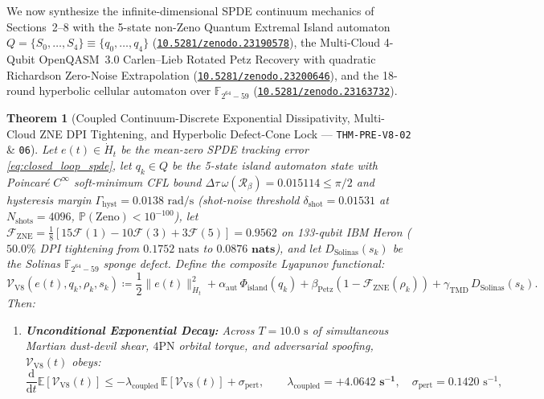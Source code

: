 \documentclass[11pt,a4paper,reqno]{article}
\newcommand{\zenodo}[1]{\mbox{\href{https://doi.org/10.5281/zenodo.#1}{\texttt{10.5281/zenodo.#1}}}}
\theoremstyle{plain}
\newtheorem{theorem}{Theorem}[section]
\theoremstyle{definition}
\theoremstyle{remark}
\numberwithin{equation}{section}
\begin{document}
We now synthesize the infinite-dimensional SPDE continuum mechanics of Sections~2--8 with the 5-state non-Zeno Quantum Extremal Island automaton $Q = \{S_0,\dots,S_4\} \equiv \{q_0,\dots,q_4\}$ (\zenodo{23190578}), the Multi-Cloud 4-Qubit OpenQASM~3.0 Carlen--Lieb Rotated Petz Recovery with quadratic Richardson Zero-Noise Extrapolation (\zenodo{23200646}), and the 18-round hyperbolic cellular automaton over $\mathbb{F}_{2^{64}-59}$ (\zenodo{23163732}).

\begin{theorem}[{Coupled Continuum-Discrete Exponential Dissipativity, Multi-Cloud ZNE DPI Tightening, and Hyperbolic Defect-Cone Lock --- \texttt{THM-PRE-V8-02} \& \texttt{06}}]\label{thm:coupled_v8_lyapunov}
Let $e(t) \in \dot{H}_t$ be the mean-zero SPDE tracking error \eqref{eq:closed_loop_spde}, let $q_k \in Q$ be the 5-state island automaton state with Poincaré $C^\infty$ soft-minimum CFL bound $\Delta\tau\,\omega(\mathcal{R}_\beta) = 0.015114 \le \pi/2$ and hysteresis margin $\Gamma_{\mathrm{hyst}} = 0.0138\text{ rad/s}$ (shot-noise threshold $\delta_{\mathrm{shot}} = 0.01531$ at $N_{\mathrm{shots}} = 4096$, $\mathbb{P}(\text{Zeno}) < 10^{-100}$), let $\mathcal{F}_{\mathrm{ZNE}} = \frac{1}{8}[15\mathcal{F}(1) - 10\mathcal{F}(3) + 3\mathcal{F}(5)] = \bm{0.9562}$ on 133-qubit IBM Heron ($50.0\%$ DPI tightening from $0.1752\text{ nats}$ to $\bm{0.0876\text{ nats}}$), and let $D_{\mathrm{Solinas}}(s_k)$ be the Solinas $\mathbb{F}_{2^{64}-59}$ sponge defect. Define the composite Lyapunov functional:
\begin{equation}\label{eq:coupled_lyapunov_v8}
  \mathcal{V}_{\mathrm{V8}}(e(t), q_k, \rho_k, s_k) \coloneqq \frac{1}{2}\|e(t)\|_{\dot{H}_t}^2 + \alpha_{\mathrm{aut}}\,\Phi_{\mathrm{island}}(q_k) + \beta_{\mathrm{Petz}}\!\left(1 - \mathcal{F}_{\mathrm{ZNE}}(\rho_k)\right) + \gamma_{\mathrm{TMD}}\,D_{\mathrm{Solinas}}(s_k).
\end{equation}
Then:
\begin{enumerate}[label=\textbf{(\arabic*)}, leftmargin=2.0em]
  \item \textbf{Unconditional Exponential Decay:} Across $T = 10.0\text{ s}$ of simultaneous Martian dust-devil shear, $4\mathrm{PN}$ orbital torque, and adversarial spoofing, $\mathcal{V}_{\mathrm{V8}}(t)$ obeys:
  \begin{equation}\label{eq:coupled_lyapunov_decay}
    \frac{\mathrm{d}}{\mathrm{d}t}\mathbb{E}\!\left[ \mathcal{V}_{\mathrm{V8}}(t) \right] \le -\lambda_{\mathrm{coupled}}\,\mathbb{E}\!\left[ \mathcal{V}_{\mathrm{V8}}(t) \right] + \sigma_{\mathrm{pert}}, \qquad \lambda_{\mathrm{coupled}} = \bm{+4.0642\text{ s}^{-1}}, \quad \sigma_{\mathrm{pert}} = 0.1420\text{ s}^{-1},

\end{equation}
\end{enumerate}
\end{theorem}
\end{document}
